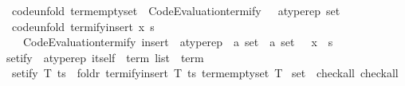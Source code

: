\begin{isabellebody}
\isanewline
\ \ {\isacharbrackleft}{\kern0pt}code{\isacharunderscore}{\kern0pt}unfold{\isacharbrackright}{\kern0pt}{\isacharcolon}{\kern0pt}\ {\isachardoublequoteopen}term{\isacharunderscore}{\kern0pt}emptyset\ {\isacharequal}{\kern0pt}\ Code{\isacharunderscore}{\kern0pt}Evaluation{\isachardot}{\kern0pt}termify\ {\isacharparenleft}{\kern0pt}{\isacharbraceleft}{\kern0pt}{\isacharbraceright}{\kern0pt}\ {\isacharcolon}{\kern0pt}{\isacharcolon}{\kern0pt}\ {\isacharparenleft}{\kern0pt}{\isacharprime}{\kern0pt}a{\isacharcolon}{\kern0pt}{\isacharcolon}{\kern0pt}typerep{\isacharparenright}{\kern0pt}\ set{\isacharparenright}{\kern0pt}{\isachardoublequoteclose}\isanewline
\isanewline
{}\isamarkupfalse%
\isanewline
\ \ {\isacharbrackleft}{\kern0pt}code{\isacharunderscore}{\kern0pt}unfold{\isacharbrackright}{\kern0pt}{\isacharcolon}{\kern0pt}\ {\isachardoublequoteopen}termify{\isacharunderscore}{\kern0pt}insert\ x\ s\ {\isacharequal}{\kern0pt}\isanewline
\ \ \ \ Code{\isacharunderscore}{\kern0pt}Evaluation{\isachardot}{\kern0pt}termify\ {\isacharparenleft}{\kern0pt}insert\ {\isacharcolon}{\kern0pt}{\isacharcolon}{\kern0pt}\ {\isacharparenleft}{\kern0pt}{\isacharprime}{\kern0pt}a{\isacharcolon}{\kern0pt}{\isacharcolon}{\kern0pt}typerep{\isacharparenright}{\kern0pt}\ {\isasymRightarrow}\ {\isacharprime}{\kern0pt}a\ set\ {\isasymRightarrow}\ {\isacharprime}{\kern0pt}a\ set{\isacharparenright}{\kern0pt}\ \ {\isacharless}{\kern0pt}{\isasymcdot}{\isachargreater}{\kern0pt}\ x\ {\isacharless}{\kern0pt}{\isasymcdot}{\isachargreater}{\kern0pt}\ s{\isachardoublequoteclose}\isanewline
\isanewline
{}\isamarkupfalse%
\ setify\ {\isacharcolon}{\kern0pt}{\isacharcolon}{\kern0pt}\ {\isachardoublequoteopen}{\isacharparenleft}{\kern0pt}{\isacharprime}{\kern0pt}a{\isacharcolon}{\kern0pt}{\isacharcolon}{\kern0pt}typerep{\isacharparenright}{\kern0pt}\ itself\ {\isasymRightarrow}\ term\ list\ {\isasymRightarrow}\ term{\isachardoublequoteclose}\isanewline
{}\isanewline
\ \ {\isachardoublequoteopen}setify\ T\ ts\ {\isacharequal}{\kern0pt}\ foldr\ {\isacharparenleft}{\kern0pt}termify{\isacharunderscore}{\kern0pt}insert\ T{\isacharparenright}{\kern0pt}\ ts\ {\isacharparenleft}{\kern0pt}term{\isacharunderscore}{\kern0pt}emptyset\ T{\isacharparenright}{\kern0pt}{\isachardoublequoteclose}\isanewline
\isanewline
{}\isamarkupfalse%
\isanewline
\isanewline
{}\isamarkupfalse%
\ set\ {\isacharcolon}{\kern0pt}{\isacharcolon}{\kern0pt}\ {\isacharparenleft}{\kern0pt}check{\isacharunderscore}{\kern0pt}all{\isacharparenright}{\kern0pt}\ check{\isacharunderscore}{\kern0pt}all\isanewline

\end{isabellebody}
